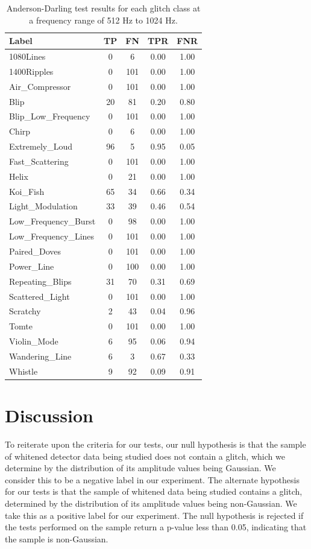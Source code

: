 \documentclass[12pt]{article}
\begin{document}
\begin{table}[H]
  \centering
  \begin{tabular}{lcccc}
  \toprule
  Label & TP & FN & TPR & FNR \\
  \midrule
  1080Lines & 0 & 6 & 0.00 & 1.00 \\
  1400Ripples & 0 & 101 & 0.00 & 1.00 \\
  Air\_Compressor & 0 & 101 & 0.00 & 1.00 \\
  Blip & 20 & 81 & 0.20 & 0.80 \\
  Blip\_Low\_Frequency & 0 & 101 & 0.00 & 1.00 \\
  Chirp & 0 & 6 & 0.00 & 1.00 \\
  Extremely\_Loud & 96 & 5 & 0.95 & 0.05 \\
  Fast\_Scattering & 0 & 101 & 0.00 & 1.00 \\
  Helix & 0 & 21 & 0.00 & 1.00 \\
  Koi\_Fish & 65 & 34 & 0.66 & 0.34 \\
  Light\_Modulation & 33 & 39 & 0.46 & 0.54 \\
  Low\_Frequency\_Burst & 0 & 98 & 0.00 & 1.00 \\
  Low\_Frequency\_Lines & 0 & 101 & 0.00 & 1.00 \\
  Paired\_Doves & 0 & 101 & 0.00 & 1.00 \\
  Power\_Line & 0 & 100 & 0.00 & 1.00 \\
  Repeating\_Blips & 31 & 70 & 0.31 & 0.69 \\
  Scattered\_Light & 0 & 101 & 0.00 & 1.00 \\
  Scratchy & 2 & 43 & 0.04 & 0.96 \\
  Tomte & 0 & 101 & 0.00 & 1.00 \\
  Violin\_Mode & 6 & 95 & 0.06 & 0.94 \\
  Wandering\_Line & 6 & 3 & 0.67 & 0.33 \\
  Whistle & 9 & 92 & 0.09 & 0.91 \\
  \bottomrule
  \end{tabular}
  \caption{Anderson-Darling test results for each glitch class at a frequency range of 512 Hz to 1024 Hz.}
  \label{tab:ad_high_frequency_results}
\end{table}

\section{Discussion}\label{Discussion}

\noindent To reiterate upon the criteria for our tests, our null hypothesis is that the sample of whitened detector data being studied does not contain a glitch, which we determine by the distribution of its amplitude values being Gaussian. We consider this to be a negative label in our experiment. The alternate hypothesis for our tests is that the sample of whitened data being studied contains a glitch, determined by the distribution of its amplitude values being non-Gaussian. We take this as a positive label for our experiment. The null hypothesis is rejected if the tests performed on the sample return a p-value less than 0.05, indicating that the sample is non-Gaussian.
\end{document}
